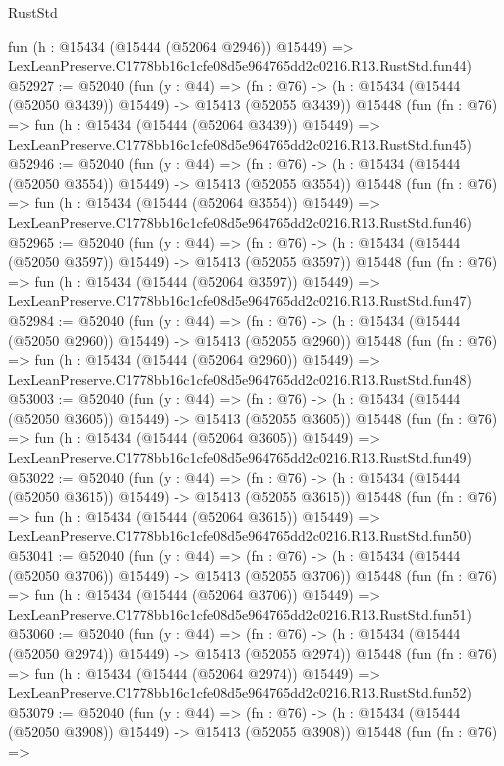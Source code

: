 \begin{lexlean}{RustStd}
\begin{coremodule}
    fun (h : @15434 (@15444 (@52064 @2946)) @15449) =>
    LexLeanPreserve.C1778bb16c1cfe08d5e964765dd2c0216.R13.RustStd.fun44)
@52927 := @52040
    (fun (y : @44) =>
    (fn : @76) -> (h : @15434 (@15444 (@52050 @3439)) @15449) -> @15413 (@52055 @3439))
    @15448
    (fun (fn : @76) =>
    fun (h : @15434 (@15444 (@52064 @3439)) @15449) =>
    LexLeanPreserve.C1778bb16c1cfe08d5e964765dd2c0216.R13.RustStd.fun45)
@52946 := @52040
    (fun (y : @44) =>
    (fn : @76) -> (h : @15434 (@15444 (@52050 @3554)) @15449) -> @15413 (@52055 @3554))
    @15448
    (fun (fn : @76) =>
    fun (h : @15434 (@15444 (@52064 @3554)) @15449) =>
    LexLeanPreserve.C1778bb16c1cfe08d5e964765dd2c0216.R13.RustStd.fun46)
@52965 := @52040
    (fun (y : @44) =>
    (fn : @76) -> (h : @15434 (@15444 (@52050 @3597)) @15449) -> @15413 (@52055 @3597))
    @15448
    (fun (fn : @76) =>
    fun (h : @15434 (@15444 (@52064 @3597)) @15449) =>
    LexLeanPreserve.C1778bb16c1cfe08d5e964765dd2c0216.R13.RustStd.fun47)
@52984 := @52040
    (fun (y : @44) =>
    (fn : @76) -> (h : @15434 (@15444 (@52050 @2960)) @15449) -> @15413 (@52055 @2960))
    @15448
    (fun (fn : @76) =>
    fun (h : @15434 (@15444 (@52064 @2960)) @15449) =>
    LexLeanPreserve.C1778bb16c1cfe08d5e964765dd2c0216.R13.RustStd.fun48)
@53003 := @52040
    (fun (y : @44) =>
    (fn : @76) -> (h : @15434 (@15444 (@52050 @3605)) @15449) -> @15413 (@52055 @3605))
    @15448
    (fun (fn : @76) =>
    fun (h : @15434 (@15444 (@52064 @3605)) @15449) =>
    LexLeanPreserve.C1778bb16c1cfe08d5e964765dd2c0216.R13.RustStd.fun49)
@53022 := @52040
    (fun (y : @44) =>
    (fn : @76) -> (h : @15434 (@15444 (@52050 @3615)) @15449) -> @15413 (@52055 @3615))
    @15448
    (fun (fn : @76) =>
    fun (h : @15434 (@15444 (@52064 @3615)) @15449) =>
    LexLeanPreserve.C1778bb16c1cfe08d5e964765dd2c0216.R13.RustStd.fun50)
@53041 := @52040
    (fun (y : @44) =>
    (fn : @76) -> (h : @15434 (@15444 (@52050 @3706)) @15449) -> @15413 (@52055 @3706))
    @15448
    (fun (fn : @76) =>
    fun (h : @15434 (@15444 (@52064 @3706)) @15449) =>
    LexLeanPreserve.C1778bb16c1cfe08d5e964765dd2c0216.R13.RustStd.fun51)
@53060 := @52040
    (fun (y : @44) =>
    (fn : @76) -> (h : @15434 (@15444 (@52050 @2974)) @15449) -> @15413 (@52055 @2974))
    @15448
    (fun (fn : @76) =>
    fun (h : @15434 (@15444 (@52064 @2974)) @15449) =>
    LexLeanPreserve.C1778bb16c1cfe08d5e964765dd2c0216.R13.RustStd.fun52)
@53079 := @52040
    (fun (y : @44) =>
    (fn : @76) -> (h : @15434 (@15444 (@52050 @3908)) @15449) -> @15413 (@52055 @3908))
    @15448
    (fun (fn : @76) =>

\end{coremodule}
\end{lexlean}
